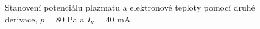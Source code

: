 \documentclass[a4paper,12pt]{article}
\begin{document}
\newpage
\begin{figure}[h]
	\centering
	\begin{subfigure}[b]{.49\textwidth}
		\centering
	\end{subfigure}
	\begin{subfigure}[b]{.49\textwidth}
		\centering
	\end{subfigure}
	\caption{Stanovení potenciálu plazmatu a elektronové teploty pomocí druhé 
	derivace, $p = 80$ 
	\si{\pascal} a $I_\text{v} = 40$ \si{\milli\ampere}.}
	\label{data4sec}
\end{figure}
\end{document}
